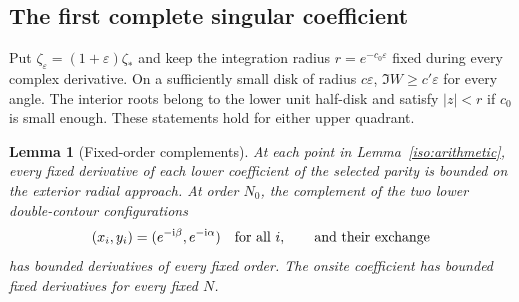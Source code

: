 \documentclass[11pt]{article}
\numberwithin{equation}{section}
\newtheorem{lemma}[theorem]{Lemma}
\theoremstyle{definition}
\newcommand{\ii}{\mathrm i}
\newcommand{\eps}{\varepsilon}
\begin{document}
\subsection{The first complete singular coefficient}

Put $\zeta_\eps=(1+\eps)\zeta_*$ and keep the integration radius
$r=e^{-c_0\eps}$ fixed during every complex derivative. On a sufficiently
small disk of radius $c\eps$, $\Im W\ge c'\eps$ for every angle.
The interior roots belong to the lower unit half-disk and satisfy
$|z|<r$ if $c_0$ is small enough. These statements hold for either
upper quadrant.

\begin{lemma}[Fixed-order complements]\label{iso:fixed}
At each point in Lemma~\ref{iso:arithmetic}, every fixed derivative of
each lower coefficient of the selected parity is bounded on the exterior
radial approach. At order $N_0$, the complement of the two lower
double-contour configurations
\[
 (x_i,y_i)=(e^{-\ii\beta},e^{-\ii\alpha})\quad\hbox{for all }i,
 \qquad\hbox{and their exchange}
\]
has bounded derivatives of every fixed order. The onsite coefficient has
bounded fixed derivatives for every fixed $N$.
\end{lemma}
\end{document}
